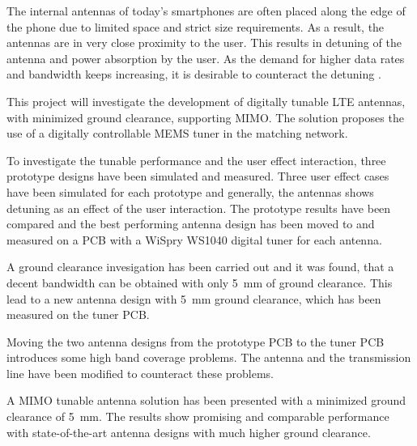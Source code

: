 \noindent
The internal antennas of today's smartphones are often placed along the edge of the phone due to limited space and strict size requirements. As a result, the antennas are in very close proximity to the user. This results in detuning of the antenna and power absorption by the user. As the demand for higher data rates and bandwidth keeps increasing, it is desirable to counteract the detuning \cite{hilbert2015tradeoff}.    

\vspace{0.5em}
\noindent
This project will investigate the development of digitally tunable LTE antennas, with minimized ground clearance, supporting MIMO.
The solution proposes the use of a digitally controllable MEMS tuner in the matching network.


\vspace{0.5em}
\noindent
To investigate the tunable performance and the user effect interaction, three prototype designs have been simulated and measured. Three user effect cases have been simulated for each prototype and generally, the antennas shows detuning as an effect of the user interaction. 
The prototype results have been compared and the best performing antenna design has been moved to and measured on a PCB with a WiSpry WS1040 digital tuner for each antenna.

\vspace{0.5em}
\noindent
A ground clearance invesigation has been carried out and it was found, that a decent bandwidth can be obtained with only \SI{5}{mm} of ground clearance. This lead to a new antenna design with \SI{5}{mm} ground clearance, which has been measured on the tuner PCB.

\vspace{0.5em}
\noindent
Moving the two antenna designs from the prototype PCB to the tuner PCB introduces some high band coverage problems. The antenna and the transmission line have been modified to counteract these problems.  

\vspace{0.5em}
\noindent
A MIMO tunable antenna solution has been presented with a minimized ground clearance of \SI{5}{mm}. The results show promising and comparable performance with state-of-the-art antenna designs with much higher ground clearance.
